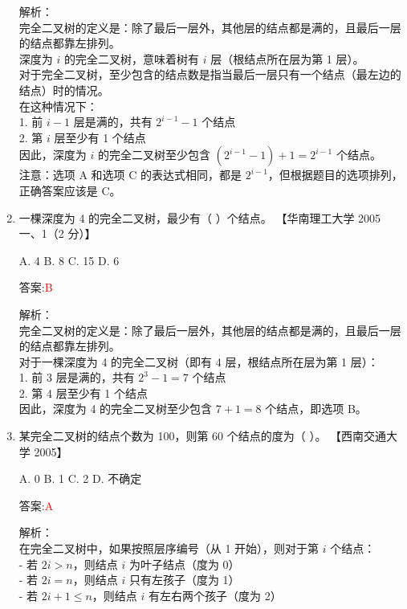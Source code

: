 \documentclass[lang=cn,newtx,10pt,scheme=chinese]{../../../elegantbook}
\begin{document}
\begin{enumerate}
    解析：\\
    完全二叉树的定义是：除了最后一层外，其他层的结点都是满的，且最后一层的结点都靠左排列。\\
    
    深度为 $i$ 的完全二叉树，意味着树有 $i$ 层（根结点所在层为第 1 层）。\\
    
    对于完全二叉树，至少包含的结点数是指当最后一层只有一个结点（最左边的结点）时的情况。\\
    
    在这种情况下：\\
    1. 前 $i-1$ 层是满的，共有 $2^{i-1} - 1$ 个结点\\
    2. 第 $i$ 层至少有 1 个结点\\
    
    因此，深度为 $i$ 的完全二叉树至少包含 $(2^{i-1} - 1) + 1 = 2^{i-1}$ 个结点。\\
    
    注意：选项 A 和选项 C 的表达式相同，都是 $2^{i-1}$，但根据题目的选项排列，正确答案应该是 C。\\

    \item 一棵深度为 4 的完全二叉树，最少有（ ）个结点。
    【华南理工大学 2005 一、1（2 分）】  

    A. 4 \quad B. 8 \quad C. 15 \quad D. 6  

    答案:\textcolor{red}{B}
    
    解析：\\
    完全二叉树的定义是：除了最后一层外，其他层的结点都是满的，且最后一层的结点都靠左排列。\\
    
    对于一棵深度为 4 的完全二叉树（即有 4 层，根结点所在层为第 1 层）：\\
    1. 前 3 层是满的，共有 $2^{3} - 1 = 7$ 个结点\\
    2. 第 4 层至少有 1 个结点\\
    
    因此，深度为 4 的完全二叉树至少包含 $7 + 1 = 8$ 个结点，即选项 B。

    \item 某完全二叉树的结点个数为 100，则第 60 个结点的度为（ ）。  
    【西南交通大学 2005】  

    A. 0 \quad B. 1 \quad C. 2 \quad D. 不确定  

    答案:\textcolor{red}{A}
    
    解析：\\
    在完全二叉树中，如果按照层序编号（从 1 开始），则对于第 $i$ 个结点：\\
    - 若 $2i > n$，则结点 $i$ 为叶子结点（度为 0）\\
    - 若 $2i = n$，则结点 $i$ 只有左孩子（度为 1）\\
    - 若 $2i + 1 \leq n$，则结点 $i$ 有左右两个孩子（度为 2）\\
    

\end{enumerate}
\end{document}
